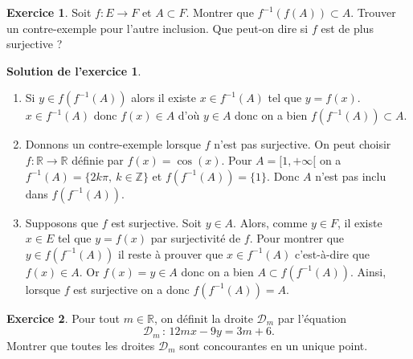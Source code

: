 \documentclass[a4paper, 11pt,openany]{article}%
\theoremstyle{plain}
\theoremstyle{definition}
\newtheorem{exo}{Exercice}
\newtheorem{sol}{Solution de l'exercice}
\theoremstyle{remark}
\newcommand{\R}{\mathbb{R}}
\newcommand{\calD}{\mathcal{D}}
\begin{document}
\begin{exo}
Soit $f :E \to F$ et $A \subset F$. Montrer que $ f^{-1}(f(A)) \subset A$. Trouver un contre-exemple pour l'autre inclusion. Que peut-on dire si $f$ est de plus surjective ?
\end{exo}

\begin{sol}
\begin{enumerate}
 \item Si $y\in f(f^{-1}(A))$ alors il existe $x\in f^{-1}(A)$ tel que $y=f(x)$. $x\in f^{-1}(A)$ donc $f(x)\in A$ d'où $y\in A$ donc on a bien $f(f^{-1}(A)) \subset A$. 
 \item Donnons un contre-exemple lorsque $f$ n'est pas surjective. On peut choisir $f\colon \mathbb R \to \mathbb R$ définie par $f(x)=\cos(x)$. Pour $A=[1,+\infty[$ on a $f^{-1}(A)=\{2k\pi, \ k\in \mathbb Z\}$ et $f(f^{-1}(A))=\{1\}$. Donc $A$ n'est pas inclu dans $f(f^{-1}(A))$.
 \item Supposons que $f$ est surjective. Soit $y\in A$. Alors, comme $y\in F$, il existe $x\in E$ tel que $y=f(x)$ par surjectivité de $f$. Pour montrer que $y\in f(f^{-1}(A))$ il reste à prouver que $x\in f^{-1}(A)$ c'est-à-dire que $f(x)\in A$. Or $f(x)=y \in A$ donc on a bien $A\subset f(f^{-1}(A))$. Ainsi, lorsque $f$ est surjective on a donc $f(f^{-1}(A))=A$.
\end{enumerate}
\end{sol}
   


\begin{exo}
Pour tout $m \in \R$, on définit la droite $\calD_m$ par l'équation
\[ \calD_m \,: \, 12mx - 9y = 3m + 6.\]
Montrer que toutes les droites  $\calD_m$ sont concourantes en un unique point.
\end{exo}
\end{document}
